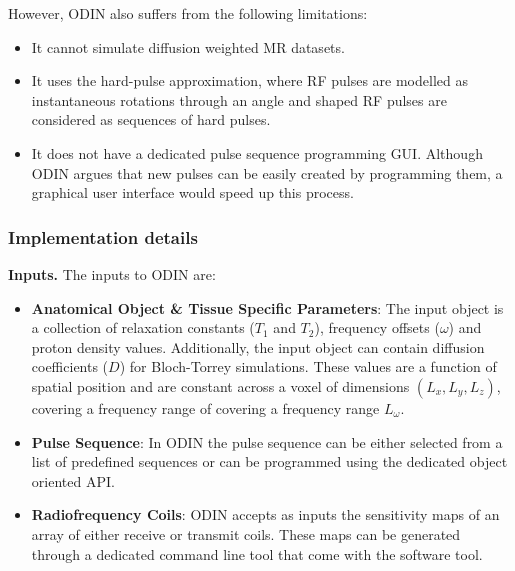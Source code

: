 However, ODIN also suffers from the following limitations:
\begin{itemize}
    
    \item It cannot simulate diffusion weighted MR datasets.
    
    \item It uses the hard-pulse approximation, where RF pulses are modelled as instantaneous rotations through an angle and shaped RF pulses are considered as sequences of hard pulses.
    
    \item It does not have a dedicated pulse sequence programming GUI. Although ODIN argues that new pulses can be easily created by programming them, a graphical user interface would speed up this process.
    
\end{itemize}

\hfill

\subsubsection{Implementation details}

\textbf{Inputs.} The inputs to ODIN are:

\begin{itemize}
    
    \item \textbf{Anatomical Object \& Tissue Specific Parameters}: 
    The input object is a collection of relaxation constants ($T_1$ and $T_2$), frequency offsets ($\omega$) and proton density values.
    Additionally, the input object can contain diffusion coefficients ($D$) for Bloch-Torrey simulations.
    These values are a function of spatial position and are constant across a voxel of dimensions $(L_x, L_y, L_z)$, covering a frequency range of covering a frequency range $L_{\omega}$.
    
    \item \textbf{Pulse Sequence}: In ODIN the pulse sequence can be either selected from a list of predefined sequences or can be programmed using the dedicated object oriented API.
    
    \item \textbf{Radiofrequency Coils}: ODIN accepts as inputs the sensitivity maps of an array of either receive or transmit coils.
    These maps can be generated through a dedicated command line tool that come with the software tool.
    
\end{itemize}


